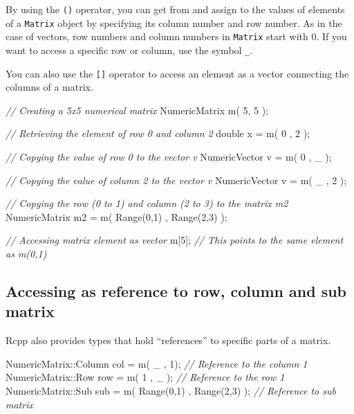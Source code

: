 \documentclass[
]{book}
\newenvironment{Shaded}{\begin{snugshade}}{\end{snugshade}}
\newcommand{\CommentTok}[1]{\textcolor[rgb]{0.56,0.35,0.01}{\textit{#1}}}
\newcommand{\DataTypeTok}[1]{\textcolor[rgb]{0.13,0.29,0.53}{#1}}
\newcommand{\DecValTok}[1]{\textcolor[rgb]{0.00,0.00,0.81}{#1}}
\newcommand{\NormalTok}[1]{#1}
\begin{document}
By using the \texttt{()} operator, you can get from and assign to the values of elements of a \texttt{Matrix} object by specifying its column number and row number. As in the case of vectors, row numbers and column numbers in \texttt{Matrix} start with 0. If you want to access a specific row or column, use the symbol \texttt{\_}.

You can also use the \texttt{{[}{]}} operator to access an element as a vector connecting the columns of a matrix.

\begin{Shaded}
\begin{Highlighting}[]
\CommentTok{// Creating a 5x5 numerical matrix}
\NormalTok{NumericMatrix m( }\DecValTok{5}\NormalTok{, }\DecValTok{5}\NormalTok{ );}

\CommentTok{// Retrieving the element of row 0 and column 2}
\DataTypeTok{double}\NormalTok{ x = m( }\DecValTok{0}\NormalTok{ , }\DecValTok{2}\NormalTok{ );}

\CommentTok{// Copying the value of row 0 to the vector v}
\NormalTok{NumericVector v = m( }\DecValTok{0}\NormalTok{ , _ );}

\CommentTok{// Copying the value of column 2 to the vector v}
\NormalTok{NumericVector v = m( _ , }\DecValTok{2}\NormalTok{ );}

\CommentTok{// Copying the row (0 to 1) and column (2 to 3) to the matrix m2}
\NormalTok{NumericMatrix m2 = m( Range(}\DecValTok{0}\NormalTok{,}\DecValTok{1}\NormalTok{) , Range(}\DecValTok{2}\NormalTok{,}\DecValTok{3}\NormalTok{) );}

\CommentTok{// Accessing matrix element as vector}
\NormalTok{m[}\DecValTok{5}\NormalTok{]; }\CommentTok{// This points to the same element as m(0,1)}
\end{Highlighting}
\end{Shaded}

\hypertarget{accessing-as-reference-to-row-column-and-sub-matrix}{%
\subsection{Accessing as reference to row, column and sub matrix}\label{accessing-as-reference-to-row-column-and-sub-matrix}}

Rcpp also provides types that hold ``references'' to specific parts of a matrix.

\begin{Shaded}
\begin{Highlighting}[]
\NormalTok{NumericMatrix::Column col = m( _ , }\DecValTok{1}\NormalTok{);  }\CommentTok{// Reference to the column 1}
\NormalTok{NumericMatrix::Row    row = m( }\DecValTok{1}\NormalTok{ , _ ); }\CommentTok{// Reference to the row 1}
\NormalTok{NumericMatrix::Sub    sub = m( Range(}\DecValTok{0}\NormalTok{,}\DecValTok{1}\NormalTok{) , Range(}\DecValTok{2}\NormalTok{,}\DecValTok{3}\NormalTok{) ); }\CommentTok{// Reference to sub matrix}
\end{Highlighting}
\end{Shaded}
\end{document}

